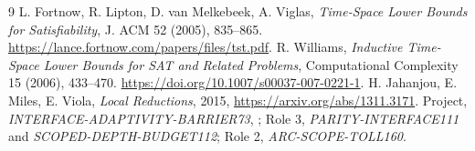 \documentclass[11pt]{article}
\begin{document}
\begin{thebibliography}{9}
 L. Fortnow, R. Lipton, D. van Melkebeek, A. Viglas,
\emph{Time-Space Lower Bounds for Satisfiability}, J. ACM 52 (2005),
835--865. \url{https://lance.fortnow.com/papers/files/tst.pdf}.
 R. Williams,
\emph{Inductive Time-Space Lower Bounds for SAT and Related Problems},
Computational Complexity 15 (2006), 433--470.
\url{https://doi.org/10.1007/s00037-007-0221-1}.
 H. Jahanjou, E. Miles, E. Viola,
\emph{Local Reductions}, 2015,
\url{https://arxiv.org/abs/1311.3171}.
 Project,
\emph{INTERFACE-ADAPTIVITY-BARRIER73},
;
Role 3,
\emph{PARITY-INTERFACE111} and \emph{SCOPED-DEPTH-BUDGET112};
Role 2, \emph{ARC-SCOPE-TOLL160}.
\end{thebibliography}
\end{document}

